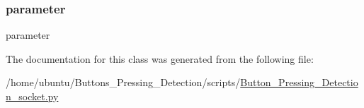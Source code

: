 \subsubsection{\texorpdfstring{parameter}{parameter}}
{\footnotesize\ttfamily parameter}



The documentation for this class was generated from the following file\+:\begin{DoxyCompactItemize}
\item 
/home/ubuntu/\+Buttons\+\_\+\+Pressing\+\_\+\+Detection/scripts/\hyperlink{a00014}{Button\+\_\+\+Pressing\+\_\+\+Detection\+\_\+socket.\+py}\end{DoxyCompactItemize}
